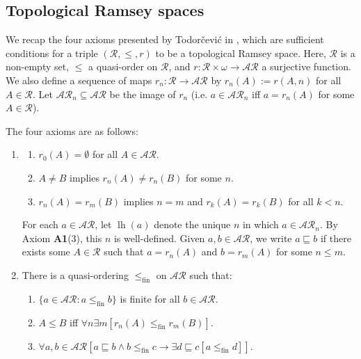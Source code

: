 \documentclass[10pt,a4paper]{amsart}
\theoremstyle{plain}
\numberwithin{equation}{section}
\theoremstyle{definition}
\newcommand{\func}{\operatorname}
\newcommand{\cal}{\mathcal}
\newcommand{\lh}{\func{lh}}
\newcommand{\fin}{\mathrm{fin}}
\begin{document}
\subsection{Topological Ramsey spaces} 
We recap the four axioms presented by Todor\v{c}evi\'{c} in \cite{T10}, which are sufficient conditions for a triple $(\cal{R},\leq,r)$ to be a topological Ramsey space. Here, $\cal{R}$ is a non-empty set, $\leq$ a quasi-order on $\cal{R}$, and $r : \cal{R} \times \omega \to \cal{AR}$ a surjective function. We also define a sequence of maps $r_n : \cal{R} \to \cal{AR}$ by $r_n(A) := r(A,n)$ for all $A \in \cal{R}$. Let $\cal{AR}_n \subseteq \cal{AR}$ be the image of $r_n$ (i.e. $a \in \cal{AR}_n$ iff $a = r_n(A)$ for some $A \in \cal{R}$). 

The four axioms are as follows:
\begin{enumerate}
    \item[\textbf{(A1)}] 
    \begin{enumerate}[label=(\arabic*)]
        \item $r_0(A) = \emptyset$ for all $A \in \cal{AR}$.

        \item $A \neq B$ implies $r_n(A) \neq r_n(B)$ for some $n$.

        \item $r_n(A) = r_m(B)$ implies $n = m$ and $r_k(A) = r_k(B)$ for all $k < n$.
    \end{enumerate}
    For each $a \in \cal{AR}$, let $\lh(a)$ denote the unique $n$ in which $a \in \cal{AR}_n$. By Axiom \textbf{A1}(3), this $n$ is well-defined. Given $a,b \in \cal{AR}$, we write $a \sqsubseteq b$ if there exists some $A \in \cal{R}$ such that $a = r_n(A)$ and $b = r_m(A)$ for some $n \leq m$.

    \item[\textbf{(A2)}]  There is a quasi-ordering $\leq_\fin$ on $\cal{AR}$ such that:
    \begin{enumerate}[label=(\arabic*)]
        \item $\{a \in \cal{AR} : a \leq_\fin b\}$ is finite for all $b \in \cal{AR}$.

        \item $A \leq B$ iff $\forall n \exists m [r_n(A) \leq_\fin r_m(B)]$.

        \item $\forall a,b \in \cal{AR}[a \sqsubseteq b \wedge b \leq_\fin c \to \exists d \sqsubseteq c[a \leq_\fin d]]$.
    \end{enumerate}


\end{enumerate}
\end{document}
